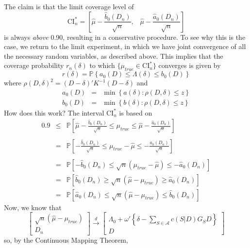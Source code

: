\documentclass[12pt]{article}
\theoremstyle{definition}
\newcommand{\p}{\mathbb{P}}
\begin{document}
The claim is that the limit coverage level of
	$$\mbox{CI}_n^* = \left[\widehat{\mu} - \frac{\widehat{b}_0(D_n)}{\sqrt{n}} , \;\;\; \widehat{\mu} - \frac{\widehat{a}_0(D_n)}{\sqrt{n}}  \right]$$
is always \emph{above} 0.90, resulting in a conservative procedure. To see why this is the case, we return to the limit experiment, in which we have joint convergence of all the necessary random variables, as described above. This implies that the coverage probability $r_n(\delta)$ to which $\{\mu_{true}\in \mbox{CI}_n^*\}$ converges is given by
	$$r(\delta) = \p \left\{ a_0(D) \leq \Lambda(\delta) \leq b_0(D)\right\}$$
where $\rho(D,\delta)^2 = \left(D - \delta\right)' K^{-1}\left(D- \delta \right)$ and
		\begin{eqnarray*}
		a_0(D)&=&\min \left\{a(\delta)\colon \rho(D, \delta) \leq z\right\}\\
		b_0(D)&=&\min \left\{b(\delta)\colon \rho(D, \delta) \leq z\right\}
\end{eqnarray*}
How does this work? The interval $\mbox{CI}_n^*$ is based on 
		\begin{eqnarray*}	
0.9&\leq&\p\left[ \widehat{\mu} - \frac{\widehat{b}_0(D_n)}{\sqrt{n}} \leq \mu_{true}\leq \widehat{\mu} - \frac{\widehat{a}_0(D_n)}{\sqrt{n}}  \right]\\\\
		&=& \p\left[  - \frac{\widehat{b}_0(D_n)}{\sqrt{n}} \leq \mu_{true} - \widehat{\mu}\leq  - \frac{\widehat{a}_0(D_n)}{\sqrt{n}}  \right]\\\\
		&=& \p\left[  - \widehat{b}_0(D_n) \leq \sqrt{n}\left(\mu_{true} - \widehat{\mu}\right)\leq  - \widehat{a}_0(D_n) \right]\\
		&=& \p\left[  \widehat{b}_0(D_n) \geq \sqrt{n}\left( \widehat{\mu}-\mu_{true}\right)\geq  \widehat{a}_0(D_n) \right]\\
		&=& \p\left[  \widehat{a}_0(D_n) \leq \sqrt{n}\left( \widehat{\mu}-\mu_{true}\right)\leq  \widehat{b}_0(D_n) \right]
\end{eqnarray*}
Now, we know that
	$$
	\left[\begin{array}{c}
		\sqrt{n}(\hat{\mu} - \mu_{true})\\
		D_n
\end{array}\right] \overset{d}{\rightarrow}
		\left[\begin{array}{c}
		\Lambda_0 + \omega' \left\{ \delta - \sum_{S \in \mathcal{A}}  c(S|D)G_S D \right\}\\
		D
\end{array}\right] 	
$$
so, by the Continuous Mapping Theorem,
\end{document}
